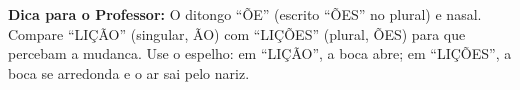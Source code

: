 \begin{dica}
\textbf{Dica para o Professor:} O ditongo ``ÕE'' (escrito ``ÕES'' no plural) e nasal. Compare ``LIÇÃO'' (singular, ÃO) com ``LIÇÕES'' (plural, ÕES) para que percebam a mudanca. Use o espelho: em ``LIÇÃO'', a boca abre; em ``LIÇÕES'', a boca se arredonda e o ar sai pelo nariz.
\end{dica}


